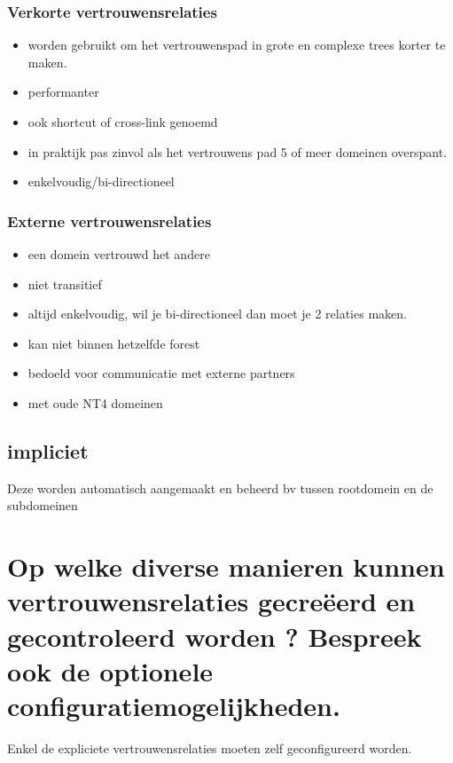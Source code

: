 \subsubsection{Verkorte vertrouwensrelaties}
\begin{itemize}
\item worden gebruikt om het vertrouwenspad in grote en complexe trees korter te maken.
\item performanter
\item ook shortcut of cross-link genoemd
\item in praktijk pas zinvol als het vertrouwens pad 5 of meer domeinen overspant.
\item enkelvoudig/bi-directioneel
\end{itemize}
 
\subsubsection{Externe vertrouwensrelaties} 
\begin{itemize}
\item een domein vertrouwd het andere
\item niet transitief
\item altijd enkelvoudig, wil je bi-directioneel dan moet je 2 relaties maken.
\item kan niet binnen hetzelfde forest
\item bedoeld voor communicatie met externe partners
\item met oude NT4 domeinen
\end{itemize}

\subsection{impliciet}
Deze worden automatisch aangemaakt en beheerd bv tussen rootdomein en de subdomeinen

\clearpage
\section{Op welke diverse manieren kunnen vertrouwensrelaties gecre\"eerd en gecontroleerd worden ? Bespreek ook de optionele configuratiemogelijkheden.}
Enkel de expliciete vertrouwensrelaties moeten zelf geconfigureerd worden.

